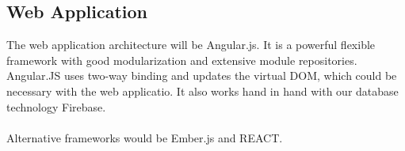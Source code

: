 \documentclass[paper=a4, fontsize=11pt]{scrartcl} %
\begin{document}
	\subsection{Web Application}
	The web application architecture will be Angular.js. It is a powerful flexible framework with good modularization and extensive module
	repositories. Angular.JS uses two-way binding and updates the virtual DOM, which could be necessary with the web applicatio. It also works
	hand in hand with our database technology Firebase.\\
	\\Alternative frameworks would be Ember.js and REACT.
\end{document}
